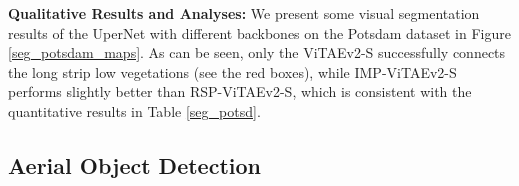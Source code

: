 \documentclass[10pt, journal,twoside]{IEEEtran}
\begin{document}
\textbf{Qualitative Results and Analyses:} We present some visual segmentation results of the UperNet with different backbones on the Potsdam dataset in Figure \ref{seg_potsdam_maps}. As can be seen, only the ViTAEv2-S successfully connects the long strip low vegetations (see the red boxes), while IMP-ViTAEv2-S performs slightly better than RSP-ViTAEv2-S, which is consistent with the quantitative results in Table \ref{seg_potsd}.

\subsection{Aerial Object Detection}

\begin{table*}[ht]
  \scriptsize
  \caption{Results of the ORCN detection model with different backbones and SOTA methods on the testing set of the DOTA dataset. : The result is from AerialDetecton \cite{aerial_det}. : The result is from the original ORCN paper.}
  \newcommand{\tabincell}[2]{\begin{tabular}{@{}#1@{}}#2\end{tabular}}
  \centering
  \begin{threeparttable}
\end{threeparttable}
\end{table*}
\end{document}
